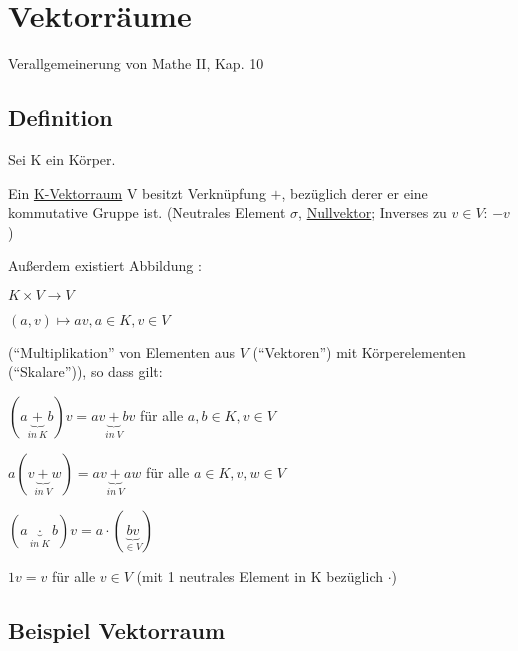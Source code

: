 \documentclass[a4paper, openany]{book}
\begin{document}
    \chapter{Vektorräume}

    Verallgemeinerung von Mathe II, Kap. 10

    \section{Definition}

    Sei K ein Körper. 

    Ein \underline{K-Vektorraum} V besitzt Verknüpfung $+$, bezüglich derer er eine kommutative Gruppe ist. (Neutrales Element $\sigma$, \underline{Nullvektor}; Inverses zu $v \in V$: $-v$)

    Außerdem existiert Abbildung :

    \begin{center}
      $K \times V \rightarrow V$ 

      $(a,v) \mapsto av, a \in K, v \in V$
    \end{center}

    (``Multiplikation'' von Elementen aus $V$ (``Vektoren'') mit Körperelementen (``Skalare'')), so dass gilt:

    \par \medskip

    $(a \underbrace{+}_{in \ K} b) v = av \underbrace{+}_{in \ V} bv$ für alle $a,b \in K, v \in V$

    \par \medskip

    $a (v \underbrace{+}_{in \ V} w) = av \underbrace{+}_{in \ V} aw$ für alle $a \in K, v,w \in V$

    \par \medskip

    $(a \underbrace{\cdot}_{in \ K} b) v = a \cdot (\underbrace{bv}_{\in V})$

    \par \medskip

    $1 v = v$ für alle $v \in V$ (mit 1 neutrales Element in K bezüglich $\cdot$)

    \section{Beispiel Vektorraum}
\end{document}
